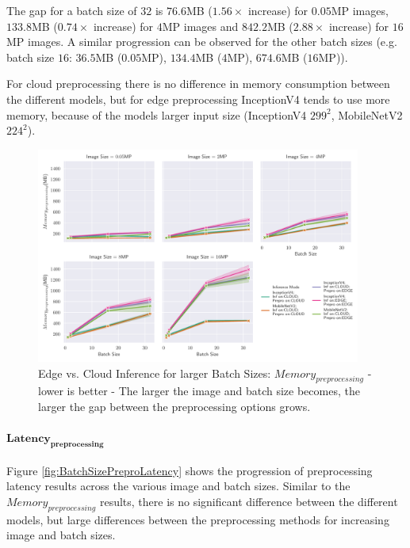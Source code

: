 The gap for a batch size of $32$ is $76.6$MB ($1.56\times$ increase) for $0.05$MP images, $133.8$MB ($0.74\times$ increase) for $4$MP images and $842.2$MB ($2.88\times$ increase) for $16$MP images. 
A similar progression can be observed for the other batch sizes (e.g. batch size $16$: $36.5$MB ($0.05$MP), $134.4$MB ($4$MP), $674.6$MB ($16$MP)).

For cloud preprocessing there is no difference in memory consumption between the different models, but for edge preprocessing InceptionV4 tends to use more memory, because of the models larger input size (InceptionV4 $299^2$, MobileNetV2 $224^2$).


\begin{figure}[!htb]
\centering
\includegraphics[width=0.95\textwidth]{./Bilder/single_plots/batch_size_plots/Effects_of_Batch_size_Preprocessing_Memory.pdf}
\caption[Edge vs. Cloud Inference for larger Batch Sizes:  $Memory_{preprocessing}$ - lower is better]{Edge vs. Cloud Inference for larger Batch Sizes:  $Memory_{preprocessing}$ - lower is better - The larger the image and batch size becomes, the larger the gap between the preprocessing options grows.}
\label{fig:BatchSizePreproMemory}
\end{figure}

\paragraph{$\mathbf{Latency_{preprocessing}}$}
Figure \ref{fig:BatchSizePreproLatency} shows the progression of preprocessing latency results across the various image and batch sizes.
Similar to the $Memory_{preprocessing}$ results, there is no significant difference between the different models, but large differences between the preprocessing methods for increasing image and batch sizes.

